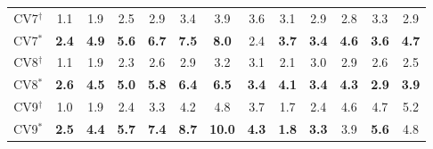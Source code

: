 \begin{table}[]
\begin{threeparttable}
\begin{tabular}{c|cccccc|cccccc}
\hline
CV7$^{\dag}$&1.1 &1.9 &2.5 &2.9 &3.4 &3.9 &3.6 &3.1 &2.9 &2.8 &3.3 &2.9 \\
CV7$^{*}$&\textbf{2.4} &\textbf{4.9} &\textbf{5.6} &\textbf{6.7} &\textbf{7.5} &\textbf{8.0} &2.4 &\textbf{3.7} &\textbf{3.4} &\textbf{4.6} &\textbf{3.6} &\textbf{4.7} \\
\hline
CV8$^{\dag}$&1.1 &1.9 &2.3 &2.6 &2.9 &3.2 &3.1 &2.1 &3.0 &2.9 &2.6 &2.5 \\
CV8$^{*}$&\textbf{2.6} &\textbf{4.5} &\textbf{5.0} &\textbf{5.8} &\textbf{6.4} &\textbf{6.5} &\textbf{3.4} &\textbf{4.1} &\textbf{3.4} &\textbf{4.3} &\textbf{2.9} &\textbf{3.9} \\
\hline
CV9$^{\dag}$&1.0 &1.9 &2.4 &3.3 &4.2 &4.8 &3.7 &1.7 &2.4 &4.6 &4.7 &5.2 \\
CV9$^{*}$&\textbf{2.5} &\textbf{4.4} &\textbf{5.7} &\textbf{7.4} &\textbf{8.7} &\textbf{10.0} &\textbf{4.3} &\textbf{1.8} &\textbf{3.3} &3.9 &\textbf{5.6} &4.8 \\

\bottomrule
\end{tabular}
\end{threeparttable}
\end{table}

